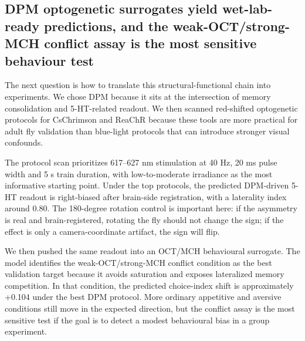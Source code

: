\documentclass[10pt]{article}
\begin{document}
\subsection*{DPM optogenetic surrogates yield wet-lab-ready predictions, and the weak-OCT/strong-MCH conflict assay is the most sensitive behaviour test}
The next question is how to translate this structural-functional chain into experiments. We chose DPM because it sits at the intersection of memory consolidation and 5-HT-related readout. We then scanned red-shifted optogenetic protocols for CsChrimson and ReaChR because these tools are more practical for adult fly validation than blue-light protocols that can introduce stronger visual confounds.

The protocol scan prioritizes 617--627 nm stimulation at 40 Hz, 20 ms pulse width and 5 s train duration, with low-to-moderate irradiance as the most informative starting point. Under the top protocols, the predicted DPM-driven 5-HT readout is right-biased after brain-side registration, with a laterality index around 0.80. The 180-degree rotation control is important here: if the asymmetry is real and brain-registered, rotating the fly should not change the sign; if the effect is only a camera-coordinate artifact, the sign will flip.

We then pushed the same readout into an OCT/MCH behavioural surrogate. The model identifies the weak-OCT/strong-MCH conflict condition as the best validation target because it avoids saturation and exposes lateralized memory competition. In that condition, the predicted choice-index shift is approximately +0.104 under the best DPM protocol. More ordinary appetitive and aversive conditions still move in the expected direction, but the conflict assay is the most sensitive test if the goal is to detect a modest behavioural bias in a group experiment.
\end{document}
